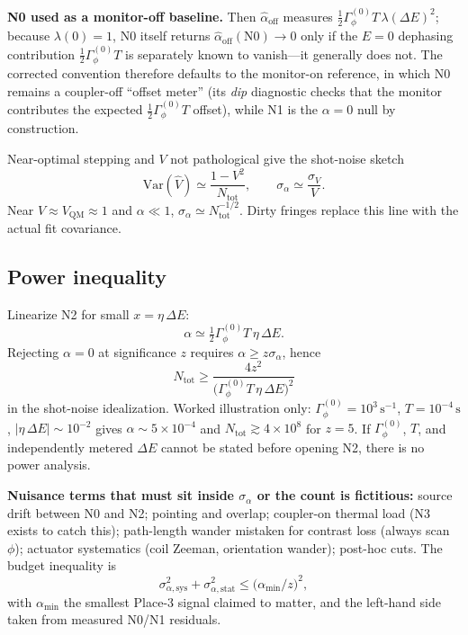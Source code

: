 \documentclass[11pt]{article}
\theoremstyle{definition}
\theoremstyle{plain}
\begin{document}
\textbf{N0 used as a monitor-off baseline.} Then $\hat\alpha_{\mathrm{off}}$ measures
$\tfrac12 \Gamma_\phi^{(0)}T\,\lambda(\Delta E)^2$; because $\lambda(0)=1$, N0 itself returns
$\hat\alpha_{\mathrm{off}}(\mathrm{N0}) \to 0$ only if the $E{=}0$ dephasing contribution
$\tfrac12 \Gamma_\phi^{(0)}T$ is separately known to vanish---it generally does not. The corrected
convention therefore defaults to the monitor-on reference, in which N0 remains a coupler-off
``offset meter'' (its \emph{dip} diagnostic checks that the monitor contributes the expected
$\tfrac12 \Gamma_\phi^{(0)}T$ offset), while N1 is the $\alpha=0$ null by construction.

Near-optimal stepping and $V$ not pathological give the shot-noise sketch
\begin{equation}
\mathrm{Var}(\hat V) \simeq \frac{1 - V^2}{N_{\mathrm{tot}}}, \qquad
\sigma_\alpha \simeq \frac{\sigma_V}{V}.
\label{eq:noise}
\end{equation}
Near $V \approx V_{\mathrm{QM}} \approx 1$ and $\alpha \ll 1$, $\sigma_\alpha \simeq N_{\mathrm{tot}}^{-1/2}$.
Dirty fringes replace this line with the actual fit covariance.

\subsection{Power inequality}

Linearize N2 for small $x = \eta\,\Delta E$:
\begin{equation}
\alpha \simeq \tfrac12 \Gamma_\phi^{(0)} T\, \eta\,\Delta E.
\label{eq:lin}
\end{equation}
Rejecting $\alpha = 0$ at significance $z$ requires $\alpha \ge z\sigma_\alpha$, hence
\begin{equation}
N_{\mathrm{tot}} \ge \frac{4z^2}{\big( \Gamma_\phi^{(0)} T\, \eta\,\Delta E \big)^2}
\label{eq:power}
\end{equation}
in the shot-noise idealization. Worked illustration only: $\Gamma_\phi^{(0)} = 10^{3}\,\mathrm{s}^{-1}$,
$T = 10^{-4}\,\mathrm{s}$, $|\eta\,\Delta E| \sim 10^{-2}$ gives $\alpha \sim 5\times10^{-4}$ and
$N_{\mathrm{tot}} \gtrsim 4\times10^{8}$ for $z=5$. If $\Gamma_\phi^{(0)}$, $T$, and independently metered
$\Delta E$ cannot be stated before opening N2, there is no power analysis.

\textbf{Nuisance terms that must sit inside $\sigma_\alpha$ or the count is fictitious:} source drift between N0
and N2; pointing and overlap; coupler-on thermal load (N3 exists to catch this); path-length wander
mistaken for contrast loss (always scan $\phi$); actuator systematics (coil Zeeman, orientation
wander); post-hoc cuts. The budget inequality is
\begin{equation}
\sigma_{\alpha,\mathrm{sys}}^2 + \sigma_{\alpha,\mathrm{stat}}^2 \le \big( \alpha_{\min}/ z \big)^2,
\label{eq:budget}
\end{equation}
with $\alpha_{\min}$ the smallest Place-3 signal claimed to matter, and the left-hand side taken from
measured N0/N1 residuals.
\end{document}
